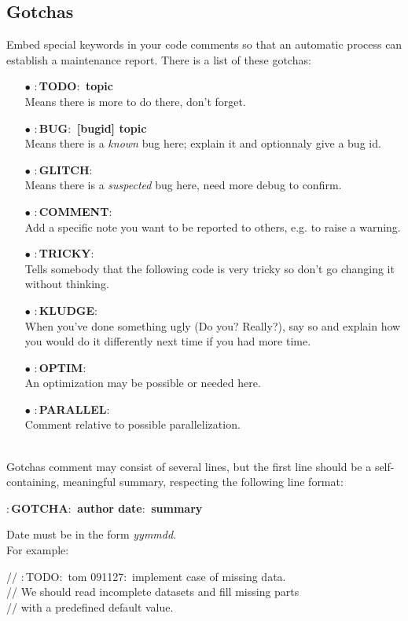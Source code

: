 \subsection{Gotchas}
Embed special keywords in your code comments so that an automatic
process can establish a maintenance report. There is a list of these
gotchas:
\begin{itemize}
\item[$\bullet$] {\bf $:$TODO$:$ topic} \\ Means there is more to do
  there, don't forget.
\item[$\bullet$] {\bf $:$BUG$:$ [bugid] topic} \\ Means there is a {\it
  known} bug here; explain it and optionnaly give a bug id.
\item[$\bullet$] {\bf $:$GLITCH$:$} \\ Means there is a {\it suspected}
  bug here, need more debug to confirm.
\item[$\bullet$] {\bf $:$COMMENT$:$} \\ Add a specific note you want to be
  reported to others, e.g. to raise a warning.
\item[$\bullet$] {\bf $:$TRICKY$:$} \\ Tells somebody that the following
  code is very tricky so don't go changing it without thinking.
\item[$\bullet$] {\bf $:$KLUDGE$:$} \\ When you've done something ugly (Do
  you? Really?), say so and explain how you would do it differently
  next time if you had more time.
\item[$\bullet$] {\bf $:$OPTIM$:$} \\ An optimization may be possible
  or needed here.
\item[$\bullet$] {\bf $:$PARALLEL$:$} \\ Comment relative to possible
  parallelization.
\end{itemize}
\ \\
Gotchas comment may consist of several lines, but the first line should be a self-containing, meaningful summary, respecting the following line format:
\begin{center}
  {\bf $:$GOTCHA$:$ author date$:$ summary}
\end{center}
Date must be in the form {\it yymmdd}.\\

For example:
\begin{algorithm}[H]
// $:$TODO$:$ tom 091127$:$ implement case of missing data. \\
// We should read incomplete datasets and fill missing parts \\
// with a predefined default value.
\end{algorithm}

